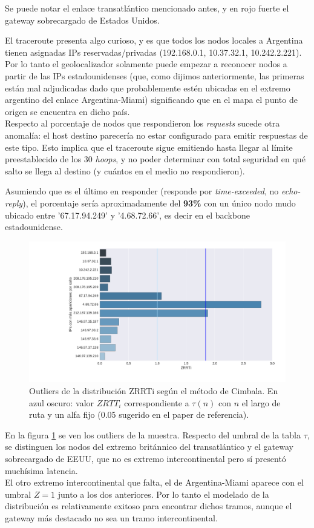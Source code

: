 Se puede notar el enlace transatlántico mencionado antes, y en rojo fuerte el gateway sobrecargado de Estados Unidos.

El traceroute presenta algo curioso, y es que todos los nodos locales a Argentina tienen asignadas IPs reservadas/privadas (192.168.0.1, 10.37.32.1, 10.242.2.221). Por lo tanto el geolocalizador solamente puede empezar a reconocer nodos a partir de las IPs estadounidenses (que, como dijimos anteriormente, las primeras están mal adjudicadas dado que probablemente estén ubicadas en el extremo argentino del enlace Argentina-Miami) significando que en el mapa el punto de origen se encuentra en dicho país. \\

Respecto al porcentaje de nodos que respondieron los \emph{requests} sucede otra anomalía: el host destino parecería no estar configurado para emitir respuestas de este tipo. Esto implica que el traceroute sigue emitiendo hasta llegar al límite preestablecido de los 30 \emph{hoops}, y no poder determinar con total seguridad en qué salto se llega al destino (y cuántos en el medio no respondieron).

Asumiendo que es el último en responder (responde por \emph{time-exceeded}, no \emph{echo-reply}), el porcentaje sería aproximadamente del \textbf{93\%} con un único nodo mudo ubicado entre '67.17.94.249' y '4.68.72.66', es decir en el backbone estadounidense.



\begin{figure}[H]
   \centering
       \includegraphics[width=1\textwidth, height=1\textheight, keepaspectratio]{../img/lan-zrtt}
 \caption{Outliers de la distribución ZRRTi según el método de Cimbala. En azul oscuro: valor $ZRTT_i$ correspondiente a $\tau(n)$ con $n$ el largo de ruta y un alfa fijo (0.05 sugerido en el paper de referencia).}
 \label{fig:lan-zrtt}
\end{figure}

En la figura \ref{fig:lan-zrtt} se ven los outliers de la muestra. Respecto del umbral de la tabla $\tau$, se distinguen los nodos del extremo británnico del transatlántico y el gateway sobrecargado de EEUU, que no es extremo intercontinental pero sí presentó muchísima latencia. \\

El otro extremo intercontinental que falta, el de Argentina-Miami aparece con el umbral $Z=1$ junto a los dos anteriores. Por lo tanto el modelado de la distribución es relativamente exitoso para encontrar dichos tramos, aunque el gateway más destacado no sea un tramo intercontinental.
